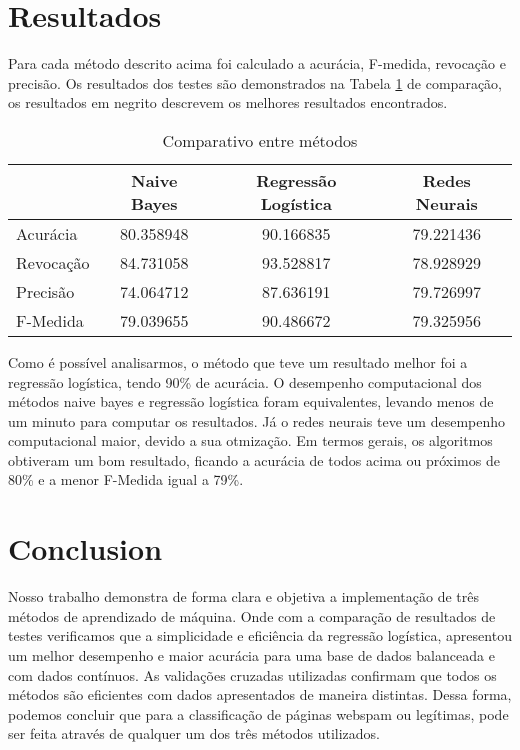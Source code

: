 \documentclass[10pt, conference, compsocconf]{IEEEtran}
\begin{document}
\section{Resultados}\label{resultados}
Para cada método descrito acima foi calculado a acurácia, F-medida, revocação e precisão. Os resultados dos testes são demonstrados na Tabela \ref{table:table_comparacao} de comparação, os resultados em negrito descrevem os melhores resultados encontrados.
\\
\begin{table}[!htpb]
\begin{small} 
\centering
\begin{tabular}{lccc}
\hline
                 & Naive Bayes & Regressão Logística  & Redes Neurais \\
\hline
Acurácia    & 80.358948  &90.166835 & 79.221436 \\
Revocação & 84.731058  & 93.528817 & 78.928929\\
Precisão    & 74.064712  & 87.636191 & 79.726997\\
F-Medida   & 79.039655  & 90.486672  & 79.325956\\
\hline
\end{tabular}
\caption{Comparativo entre métodos}
\label{table:table_comparacao}
\end{small}
\end{table} 

Como é possível analisarmos, o método que teve um resultado melhor foi a regressão logística, tendo 90\% de acurácia. O desempenho computacional dos métodos naive bayes e regressão logística foram equivalentes, levando menos de um minuto para computar os resultados. Já o redes neurais teve um desempenho computacional maior, devido a sua otmização.
Em termos gerais, os algoritmos obtiveram um bom resultado, ficando a acurácia de todos acima ou próximos de 80\% e a menor F-Medida igual a 79\%.

\section{Conclusion}\label{conclusao}
Nosso trabalho demonstra de forma clara e objetiva a implementação de três métodos de aprendizado de máquina. Onde com a comparação de resultados de testes verificamos que a simplicidade e eficiência da regressão logística, apresentou um melhor desempenho e maior acurácia para uma base de dados balanceada e com dados contínuos. As validações cruzadas utilizadas confirmam que todos os métodos são eficientes com dados apresentados de maneira distintas.
Dessa forma, podemos concluir que para a classificação de páginas webspam ou legítimas, pode ser feita através de qualquer um dos três métodos utilizados.
\end{document}
